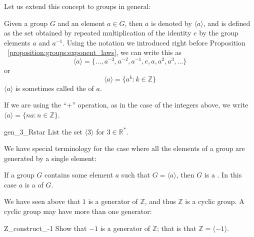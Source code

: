 Let us extend this concept to groups in general:

\begin{defn}\label{defn_set_gen} Given a group $G$ and an element $a \in G$, then  $a$ is denoted by $\langle a \rangle$, and is defined as the set obtained by repeated multiplication of the identity $e$ by the group elements $a$ and $a^{-1}$.  Using the notation we introduced right before Proposition ~\ref{proposition:groups:exponent_laws}, we can write this as
\[ \langle a \rangle = \{ \ldots, a^{-3}, a^{-2}, a^{-1}, e, a, a^2, a^3, \ldots \} \]
\noindent
or
\[ \langle a \rangle = \{ a^{k} : k \in \mathbb Z \} \]
$\langle a \rangle$ is sometimes called the  of $a$.
\end{defn}
\begin{rem}\label{rem_orbits}
If we are using the ``+'' operation, as in the case of the integers above, we write $\langle a \rangle  = \{ na : n \in {\mathbb Z} \}$.
\end{rem}

\begin{exercise}{gen_3_Rstar}
List the set $\langle 3 \rangle$ for $3 \in {\mathbb R}^*$.
\end{exercise}

\noindent
We have special terminology for the case where all the elements of a group are generated by a single element:

\begin{defn}\label{cyclic_generator}
 If a group $G$ contains some element $a$ such that $G = \langle a \rangle $, then $G$ is a
. In this case $a$ is a  of $G$.
\end{defn}

We have seen above that $1$ is a generator of $\mathbb Z$, and thus $\mathbb Z$ is a cyclic group.
A cyclic group may have more than one generator: 

\begin{exercise}{Z_construct_-1}
Show that $-1$ is a generator of $\mathbb Z$; that is that $\mathbb Z = \langle -1 \rangle$.
\end{exercise} 
 
